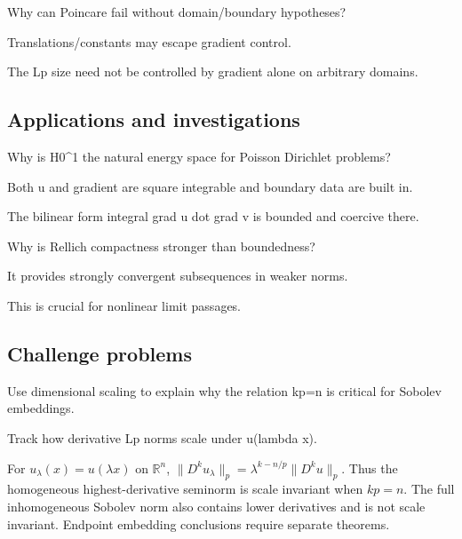 \begin{exercise}\label{exr:iii21-expand-12}
Why can Poincare fail without domain/boundary hypotheses?
\end{exercise}
\begin{hint}
Translations/constants may escape gradient control.
\end{hint}
\begin{solution}
The Lp size need not be controlled by gradient alone on arbitrary domains.
\end{solution}

\subsection*{Applications and investigations}

\begin{exercise}\label{exr:iii21-expand-13}
Why is H0\textasciicircum{}1 the natural energy space for Poisson Dirichlet problems?
\end{exercise}
\begin{hint}
Both u and gradient are square integrable and boundary data are built in.
\end{hint}
\begin{solution}
The bilinear form integral grad u dot grad v is bounded and coercive there.
\end{solution}

\begin{exercise}[Compactness]\label{exr:iii21-expand-14}
Why is Rellich compactness stronger than boundedness?
\end{exercise}
\begin{hint}
It provides strongly convergent subsequences in weaker norms.
\end{hint}
\begin{solution}
This is crucial for nonlinear limit passages.
\end{solution}

\subsection*{Challenge problems}

\begin{exercise}\label{exr:iii21-expand-15}
Use dimensional scaling to explain why the relation kp=n is critical for Sobolev embeddings.
\end{exercise}
\begin{hint}
Track how derivative Lp norms scale under u(lambda x).
\end{hint}
\begin{solution}
For $u_\lambda(x)=u(\lambda x)$ on $\mathbb R^n$, $\|D^ku_\lambda\|_p=\lambda^{k-n/p}\|D^ku\|_p$. Thus the homogeneous highest-derivative seminorm is scale invariant when $kp=n$. The full inhomogeneous Sobolev norm also contains lower derivatives and is not scale invariant. Endpoint embedding conclusions require separate theorems.
\end{solution}

